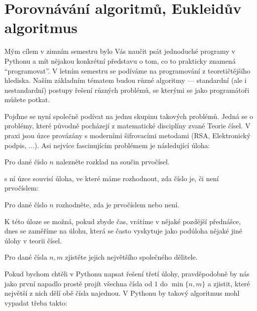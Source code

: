 \ifx\ucebnice\undefined

\fi
\section{Porovnávání algoritmů, Eukleidův algoritmus}

Mým cílem v zimním semestru bylo Vás naučit psát jednoduché programy v Pythonu a mít nějakou konkrétní představu o tom,
co to prakticky znamená ``programovat''. V letním semestru se podíváme na programování z teoretičtějšího hlediska.
Naším základním tématem budou různé algoritmy --- standardní (ale i nestandardní) postupy řešení různých problémů, 
se kterými se jako programátoři můžete potkat. 

Pojďme se nyní společně podívat na jednu skupinu takových problémů. Jedná se o problémy, které původně pocházejí z
matematické disciplíny zvané Teorie čísel. V praxi jsou úzce provázány s moderními šifrovacími metodami 
(RSA, Elektronický podpis, ...). Asi nejvíce fascinujícím problémem je následující úloha:

\begin{ukol}
Pro dané číslo $n$ nalezněte rozklad na součin prvočísel.
\end{ukol}

s ní úzce souvisí úloha, ve které máme rozhodnout, zda číslo je, či není prvočíslem:

\begin{ukol}
Pro dané číslo $n$ rozhodněte, zda je prvočíslem nebo není.
\end{ukol}

K této úloze se možná, pokud zbyde čas, vrátíme v nějaké pozdější přednášce, dnes se zaměříme na úlohu,
která se často vyskytuje jako podúloha nějaké jiné úlohy v teorii čísel. 

\begin{ukol}
Pro dané čísla $n,m$ zjistěte jejich největšího společného dělitele.
\end{ukol}


Pokud bychom chtěli v Pythonu napsat řešení třetí úlohy, pravděpodobně by nás jako první napadlo prostě
projít všechna čísla od $1$ do $\min \{n,m\}$ a zjistit, které největší z nich dělí obě čísla najednou.
V Pythonu by takový algoritmus mohl vypadat třeba takto:

